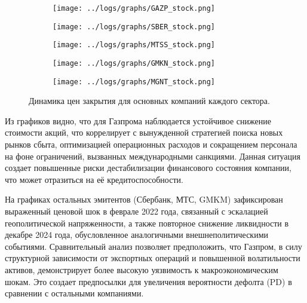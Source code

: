 \documentclass[]{article}
\begin{document}
	\begin{figure}[h]
		\centering
		\begin{subfigure}[b]{0.48\textwidth} %
			\texttt{[image: ../logs/graphs/GAZP\_stock.png]}
			\label{fig:img1}
		\end{subfigure}
		\hfill %
		\begin{subfigure}[b]{0.48\textwidth}
			\texttt{[image: ../logs/graphs/SBER\_stock.png]}
			\label{fig:img2}
		\end{subfigure}
		\begin{subfigure}[b]{0.48\textwidth}
			\texttt{[image: ../logs/graphs/MTSS\_stock.png]}
			\label{fig:img3}
		\end{subfigure}
		\hfill
		\begin{subfigure}[b]{0.48\textwidth}
			\texttt{[image: ../logs/graphs/GMKN\_stock.png]}
			\label{fig:img4}
		\end{subfigure}
		\begin{subfigure}[b]{0.48\textwidth}
			\texttt{[image: ../logs/graphs/MGNT\_stock.png]}
			\label{fig:img4}
		\end{subfigure}
				
		\caption{Динамика цен закрытия для основных компаний каждого сектора.}
		\label{fig:stocks}
	\end{figure}
	
	Из графиков видно, что для Газпрома наблюдается устойчивое снижение стоимости акций, что коррелирует с вынужденной стратегией поиска новых рынков сбыта, оптимизацией операционных расходов и сокращением персонала на фоне ограничений, вызванных международными санкциями. Данная ситуация создает повышенные риски дестабилизации финансового состояния компании, что может отразиться на её кредитоспособности.  
	
	На графиках остальных эмитентов (Сбербанк, МТС, GMKM) зафиксирован выраженный ценовой шок в феврале 2022 года, связанный с эскалацией геополитической напряженности, а также повторное снижение ликвидности в декабре 2024 года, обусловленное аналогичными внешнеполитическими событиями. Сравнительный анализ позволяет предположить, что Газпром, в силу структурной зависимости от экспортных операций и повышенной волатильности активов, демонстрирует более высокую уязвимость к макроэкономическим шокам. Это создает предпосылки для увеличения вероятности дефолта (PD) в сравнении с остальными компаниями.  
	
\end{document}
